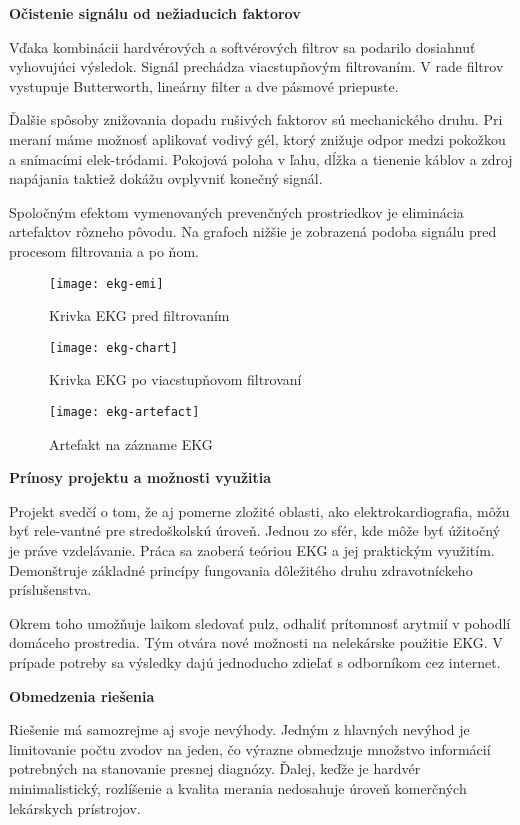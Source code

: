 \documentclass[titlepage,12pt]{article}
\begin{document}
\textbf{Očistenie signálu od nežiaducich faktorov}

Vďaka kombinácii hardvérových a softvérových filtrov sa podarilo dosiahnuť vyhovujúci výsledok. Signál prechádza viacstupňovým filtrovaním. V rade filtrov  vystupuje Butterworth, lineárny filter a dve pásmové priepuste. 

Ďalšie spôsoby znižovania dopadu rušivých faktorov sú mechanického druhu. Pri meraní máme možnosť aplikovať vodivý gél, ktorý znižuje odpor medzi pokožkou a snímacími elek-tródami. Pokojová poloha v ľahu, dĺžka a tienenie káblov a zdroj napájania taktiež dokážu ovplyvniť konečný signál.

Spoločným efektom vymenovaných prevenčných prostriedkov je eliminácia artefaktov \linebreak rôzneho pôvodu. Na grafoch nižšie je zobrazená podoba signálu pred procesom filtrovania \linebreak a po ňom.

\begin{figure}[!ht]
\begin{center}
\texttt{[image: ekg-emi]}
\caption{Krivka EKG pred filtrovaním}
\texttt{[image: ekg-chart]}
\caption{Krivka EKG po viacstupňovom filtrovaní}
\texttt{[image: ekg-artefact]}
\caption{Artefakt na zázname EKG}
\end{center}
\end{figure}

\newpage

\textbf{Prínosy projektu a možnosti využitia}

Projekt svedčí o tom, že aj pomerne zložité oblasti, ako elektrokardiografia, môžu byť rele-vantné pre stredoškolskú úroveň. Jednou zo sfér, kde môže byť úžitočný je práve vzdelávanie. Práca sa zaoberá teóriou EKG a jej praktickým využitím. Demonštruje základné princípy fungovania dôležitého druhu zdravotníckeho príslušenstva.

Okrem toho umožňuje laikom sledovať pulz, odhaliť prítomnosť arytmií v pohodlí domáceho prostredia. Tým otvára nové možnosti na nelekárske použitie EKG. V prípade potreby sa výsledky dajú jednoducho zdieľať s odborníkom cez internet.
\\
\bigskip

\textbf{Obmedzenia riešenia}

Riešenie má samozrejme aj svoje nevýhody. Jedným z hlavných nevýhod je limitovanie počtu zvodov na jeden, čo výrazne obmedzuje množstvo informácií potrebných na stanovanie presnej diagnózy. Ďalej, keďže je hardvér minimalistický, rozlíšenie a kvalita merania nedosahuje úroveň komerčných lekárskych prístrojov.
\\
\bigskip
\end{document}
